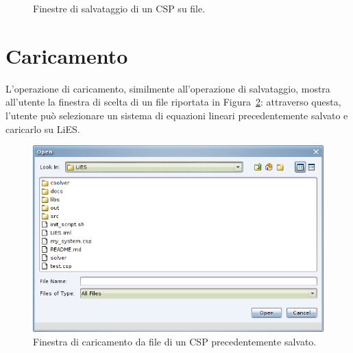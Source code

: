 \documentclass{article}
\begin{document}
\begin{figure}[htp!]
\centering
	\caption{Finestre di salvataggio di un CSP su file.}
	\label{fig:salvataggio}
\end{figure}


\section{Caricamento}
\label{sec:caricamento}

L'operazione di caricamento, similmente all'operazione di salvataggio, mostra all'utente la finestra di scelta di un file riportata in Figura~\ref{fig:caricamento}: attraverso questa, l'utente può selezionare un sistema di equazioni lineari precedentemente salvato e caricarlo su LiES. 

\begin{figure}[htp!]
	\centering
	\includegraphics[scale=.5]{ug-images/load-dialog.png}
	\caption{Finestra di caricamento da file di un CSP precedentemente salvato.}
	\label{fig:caricamento}
\end{figure}
\end{document}
